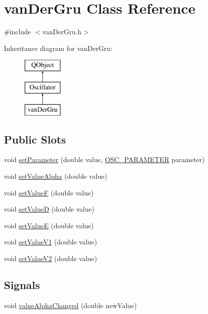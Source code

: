 \hypertarget{classvan_der_gru}{\section{van\+Der\+Gru Class Reference}
\label{classvan_der_gru}
}


{\ttfamily \#include $<$van\+Der\+Gru.\+h$>$}

Inheritance diagram for van\+Der\+Gru\+:\begin{figure}[H]
\begin{center}
\leavevmode
\includegraphics[height=3.000000cm]{classvan_der_gru}
\end{center}
\end{figure}
\subsection*{Public Slots}
\begin{DoxyCompactItemize}
\item 
void \hyperlink{classvan_der_gru_a7f23f10c78105ec2821acf928db7785d}{set\+Parameter} (double value, \hyperlink{heart_defines_8h_a79395aba577c2bc57e7ca211ff3476a6}{O\+S\+C\+\_\+\+P\+A\+R\+A\+M\+E\+T\+E\+R} parameter)
\item 
void \hyperlink{classvan_der_gru_a4be827aa1f0c024551f214aaa18cdd2e}{set\+Value\+Alpha} (double value)
\item 
void \hyperlink{classvan_der_gru_a48bf636ecb611cb6e763cc25370e6635}{set\+Value\+F} (double value)
\item 
void \hyperlink{classvan_der_gru_a0336d6c2ff3cd05535ed2e9c23b71dd8}{set\+Value\+D} (double value)
\item 
void \hyperlink{classvan_der_gru_a858d11b40253534ea8602471dc09e22b}{set\+Value\+E} (double value)
\item 
void \hyperlink{classvan_der_gru_a82f8824f96b8a8d18ae8c5fcda0a2121}{set\+Value\+V1} (double value)
\item 
void \hyperlink{classvan_der_gru_a11eabc477ff53a702cfcca3cceab6af3}{set\+Value\+V2} (double value)
\end{DoxyCompactItemize}
\subsection*{Signals}
\begin{DoxyCompactItemize}
\item 
void \hyperlink{classvan_der_gru_ae8e3c263e0bdd6f6768d9592c24917a6}{value\+Alpha\+Changed} (double new\+Value)
\end{DoxyCompactItemize}
